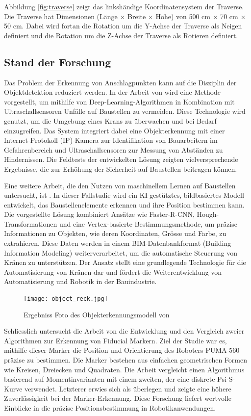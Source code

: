 Abbildung \ref{fig:traverse} zeigt das linkshändige Koordinatensystem der Traverse.
Die Traverse hat Dimensionen (Länge × Breite × Höhe) von 500 cm × 70 cm × 50 cm.
Dabei wird fortan die Rotation um die Y-Achse der Traverse als Neigen definiert und die Rotation 
um die Z-Achse der Traverse als Rotieren definiert.

\subsection{Stand der Forschung}
Das Problem der Erkennung von Anschlagpunkten kann auf die Disziplin der Objektdetektion reduziert werden.
In der Arbeit von \cite{yong_object_2023} wird eine Methode vorgestellt, um mithilfe von Deep-Learning-Algorithmen 
in Kombination mit Ultraschallsensoren Unfälle auf Baustellen zu vermeiden. Diese Technologie wird genutzt, um die
Umgebung eines Krans zu überwachen und bei Bedarf einzugreifen. Das System integriert dabei eine Objekterkennung mit
einer Internet-Protokoll (IP)-Kamera zur Identifikation von Bauarbeitern im Gefahrenbereich und Ultraschallsensoren zur 
Messung von Abständen zu Hindernissen. Die Feldtests der entwickelten Lösung zeigten vielversprechende Ergebnisse, die 
zur Erhöhung der Sicherheit auf Baustellen beitragen können.


Eine weitere Arbeit, die den Nutzen von maschinellem Lernen auf Baustellen untersucht, ist \cite{zhou_image-based_2021}. 
In dieser Fallstudie wird ein KI-gestütztes, bildbasiertes Modell entwickelt, das Baustellenelemente erkennen und ihre 
Position bestimmen kann. Die vorgestellte Lösung kombiniert Ansätze wie Faster-R-CNN, Hough-Transformationen und eine Vertex-basierte
Bestimmungsmethode, um präzise Informationen zu Objekten, wie deren Koordinaten, Grösse und Farbe, zu extrahieren. Diese Daten werden
in einem BIM-Datenbankformat (Building Information Modeling) weiterverarbeitet, um die automatische Steuerung von Kränen zu unterstützen.
Der Ansatz stellt eine grundlegende Technologie für die Automatisierung von Kränen dar und fördert die Weiterentwicklung von Automatisierung 
und Robotik in der Bauindustrie.

\begin{figure}[H]
    \centering
    \texttt{[image: object\_reck.jpg]}
    \caption{Ergebniss Foto des Objekterkennungsmodell von \cite{yong_object_2023}}
\end{figure}

Schliesslich untersucht die Arbeit von \cite{nasaMarkerReport} die Entwicklung und den Vergleich zweier Algorithmen zur Erkennung von 
Fiducial Markern. Ziel der Studie war es, mithilfe dieser Marker die Position und Orientierung des Roboters PUMA 560 präzise zu bestimmen. 
Die Marker bestehen aus einfachen geometrischen Formen wie Kreisen, Dreiecken und Quadraten. Die Arbeit vergleicht einen Algorithmus basierend 
auf Momentinvarianten mit einem zweiten, der eine diskrete Psi-S-Kurve verwendet. Letzterer erwies sich als überlegen und zeigte eine höhere 
Zuverlässigkeit bei der Marker-Erkennung. Diese Forschung liefert wertvolle Einblicke in die präzise Positionsbestimmung in Robotikanwendungen.

